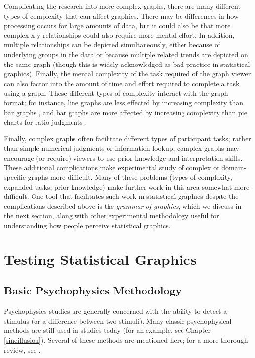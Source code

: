 \documentclass[11pt]{isuthesis}\usepackage[]{graphicx}\usepackage[]{color}
\begin{document}
Complicating the research into more complex graphs, there are many different types of complexity that can affect graphics. There may be differences in how processing occurs for large amounts of data, but it could also be that more complex x-y relationships could also require more mental effort. In addition, multiple relationships can be depicted simultaneously, either because of underlying groups in the data or because multiple related trends are depicted on the same graph (though this is widely acknowledged as bad practice in statistical graphics). Finally, the mental complexity of the task required of the graph viewer can also factor into the amount of time and effort required to complete a task using a graph. These different types of complexity interact with the graph format; for instance, line graphs are less effected by increasing complexity than bar graphs \citep{tan1994human}, and bar graphs are more affected by increasing complexity than pie charts for ratio judgments \citep{hollands1998judging}. 

Finally, complex graphs often facilitate different types of participant tasks; rather than simple numerical judgments or information lookup, complex graphs may encourage (or require) viewers to use prior knowledge and interpretation skills. These additional complications make experimental study of complex or domain-specific graphs more difficult. Many of these problems (types of complexity, expanded tasks, prior knowledge) make further work in this area somewhat more difficult. One tool that facilitates such work in statistical graphics despite the complications described above is the \emph{grammar of graphics}, which we discuss in the next section, along with other experimental methodology useful for understanding how people perceive statistical graphics. 


\section{Testing Statistical Graphics}
\subsection{Basic Psychophysics Methodology}
Psychophysics studies are generally concerned with the ability to detect a stimulus (or a difference between two stimuli). Many classic psychophysical methods are still used in studies today (for an example, see Chapter \ref{sineillusion}). Several of these methods are mentioned here; for a more thorough review, see \citet{goldstein}. 
\end{document}
